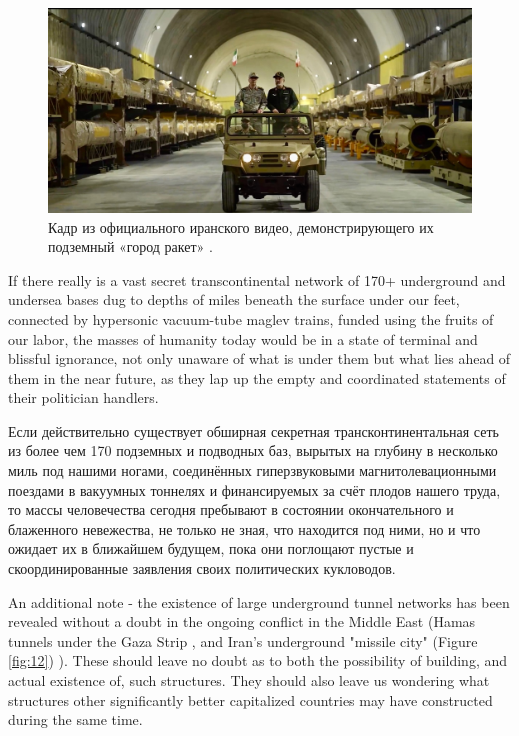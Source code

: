 \documentclass[10pt,twocolumn,letterpaper]{article}
\begin{document}
\begin{figure}[t]
\begin{center}
   \includegraphics[width=1\linewidth]{iran.jpeg}
\end{center}
   \caption{Кадр из официального иранского видео, демонстрирующего их подземный «город ракет» \cite{39,40}.}
\label{fig:12}
\label{fig:onecol}
\end{figure}
If there really is a vast secret transcontinental network of 170+ underground and undersea bases dug to depths of miles beneath the surface under our feet, connected by hypersonic vacuum-tube maglev trains, funded using the fruits of our labor, the masses of humanity today would be in a state of terminal and blissful ignorance, not only unaware of what is under them but what lies ahead of them in the near future, as they lap up the empty and coordinated statements of their politician handlers.

Если действительно существует обширная секретная трансконтинентальная сеть из более чем 170 подземных и подводных баз, вырытых на глубину в несколько миль под нашими ногами, соединённых гиперзвуковыми магнитолевационными поездами в вакуумных тоннелях и финансируемых за счёт плодов нашего труда, то массы человечества сегодня пребывают в состоянии окончательного и блаженного невежества, не только не зная, что находится под ними, но и что ожидает их в ближайшем будущем, пока они поглощают пустые и скоординированные заявления своих политических кукловодов.

An additional note - the existence of large underground tunnel networks has been revealed without a doubt in the ongoing conflict in the Middle East (Hamas tunnels under the Gaza Strip \cite{38}, and Iran's underground "missile city" (Figure \ref{fig:12}) \cite{39,40}). These should leave no doubt as to both the possibility of building, and actual existence of, such structures. They should also leave us wondering what structures other significantly better capitalized countries may have constructed during the same time.
\end{document}
